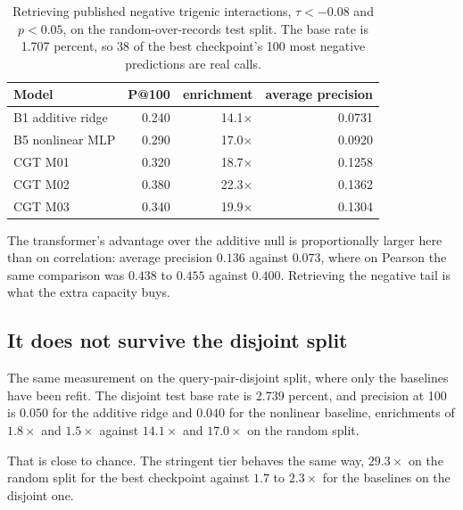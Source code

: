 \begin{table}[htbp]
\centering
\begin{tabular}{lrrr}
\hline
Model & P@100 & enrichment & average precision \\
\hline
B1 additive ridge & 0.240 & 14.1$\times$ & 0.0731 \\
B5 nonlinear MLP & 0.290 & 17.0$\times$ & 0.0920 \\
CGT M01 & 0.320 & 18.7$\times$ & 0.1258 \\
CGT M02 & 0.380 & 22.3$\times$ & 0.1362 \\
CGT M03 & 0.340 & 19.9$\times$ & 0.1304 \\
\hline
\end{tabular}
\caption{Retrieving published negative trigenic interactions,
$\tau < -0.08$ and $p < 0.05$, on the random-over-records test split. The base
rate is 1.707 percent, so 38 of the best checkpoint's 100 most negative
predictions are real calls.}
\label{tab:retrieval}
\end{table}

The transformer's advantage over the additive null is proportionally larger here
than on correlation: average precision $0.136$ against $0.073$, where on Pearson
the same comparison was $0.438$ to $0.455$ against $0.400$. Retrieving the
negative tail is what the extra capacity buys.

\subsection{It does not survive the disjoint split}

The same measurement on the query-pair-disjoint split, where only the baselines
have been refit. The disjoint test base rate is 2.739 percent, and precision at
100 is $0.050$ for the additive ridge and $0.040$ for the nonlinear baseline,
enrichments of $1.8\times$ and $1.5\times$ against $14.1\times$ and $17.0\times$
on the random split.

That is close to chance. The stringent tier behaves the same way, $29.3\times$ on
the random split for the best checkpoint against $1.7$ to $2.3\times$ for the
baselines on the disjoint one.


